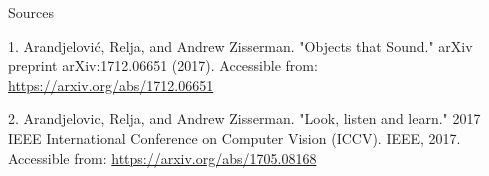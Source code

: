 \documentclass{beamer}
\begin{document}
\begin{frame}{Sources}

\begin{thebibliography}{0}

   1. Arandjelović, Relja, and Andrew Zisserman. "Objects that Sound." arXiv preprint arXiv:1712.06651 (2017). Accessible from: \url{https://arxiv.org/abs/1712.06651}
  
   2. Arandjelovic, Relja, and Andrew Zisserman. "Look, listen and learn." 2017 IEEE International Conference on Computer Vision (ICCV). IEEE, 2017. Accessible from: \url{https://arxiv.org/abs/1705.08168}
\end{thebibliography}
\end{frame}
 
 
 
\end{document}
